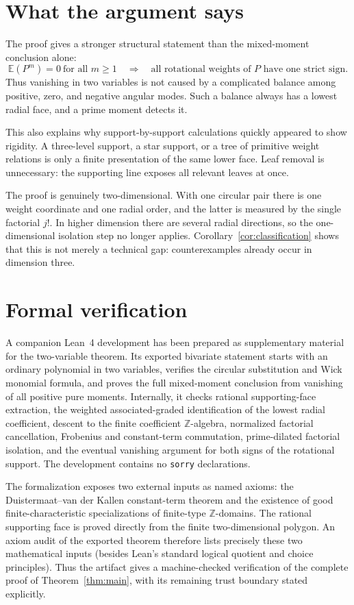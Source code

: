 \documentclass[11pt]{article}
\newcommand{\Z}{\mathbb Z}
\newcommand{\E}{\mathbb E}
\begin{document}
\section{What the argument says}

The proof gives a stronger structural statement than the mixed-moment
conclusion alone:
\[
  \E(P^m)=0\ \text{for all }m\geq1
  \quad\Longrightarrow\quad
  \text{all rotational weights of \(P\) have one strict sign.}
\]
Thus vanishing in two variables is not caused by a complicated balance
among positive, zero, and negative angular modes.  Such a balance always
has a lowest radial face, and a prime moment detects it.

This also explains why support-by-support calculations quickly appeared to
show rigidity.  A three-level support, a star support, or a tree of
primitive weight relations is only a finite presentation of the same lower
face.  Leaf removal is unnecessary: the supporting line exposes all
relevant leaves at once.

The proof is genuinely two-dimensional.  With one circular pair there is
one weight coordinate and one radial order, and the latter is measured by
the single factorial \(j!\).  In higher dimension there are several radial
directions, so the one-dimensional isolation step no longer applies.
Corollary~\ref{cor:classification} shows that this is not merely a
technical gap: counterexamples already occur in dimension three.

\section{Formal verification}

A companion Lean~4 development has been prepared as supplementary material
for the two-variable theorem.  Its exported bivariate statement starts
with an ordinary polynomial in two variables, verifies the circular
substitution and Wick monomial formula, and proves the full mixed-moment
conclusion from vanishing of all positive pure moments.  Internally, it
checks rational supporting-face extraction, the weighted
associated-graded identification of the lowest radial coefficient, descent
to the finite coefficient \(\Z\)-algebra, normalized factorial
cancellation, Frobenius and constant-term commutation, prime-dilated
factorial isolation, and the eventual vanishing argument for both signs of
the rotational support.  The development contains no \texttt{sorry}
declarations.

The formalization exposes two external inputs as named axioms: the
Duistermaat--van der Kallen constant-term theorem and the existence of good
finite-characteristic specializations of finite-type \(\Z\)-domains.  The
rational supporting face is proved directly from the finite
two-dimensional polygon.  An axiom audit of the exported theorem therefore
lists precisely these two mathematical inputs (besides Lean's standard
logical quotient and choice principles).  Thus the artifact gives a
machine-checked verification of the complete proof of
Theorem~\ref{thm:main}, with its remaining trust boundary stated
explicitly.
\end{document}

